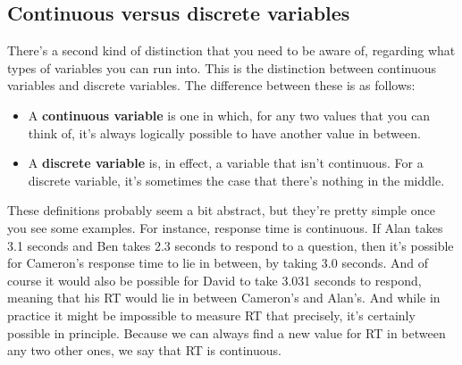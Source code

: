 \documentclass[
]{book}
\begin{document}
\hypertarget{continuous-versus-discrete-variables}{%
\subsection{Continuous versus discrete variables}\label{continuous-versus-discrete-variables}}

There's a second kind of distinction that you need to be aware of, regarding what types of variables you can run into. This is the distinction between continuous variables and discrete variables. The difference between these is as follows:

\begin{itemize}
\item
  A \textbf{continuous variable} is one in which, for any two values that you can think of, it's always logically possible to have another value in between.
\item
  A \textbf{discrete variable} is, in effect, a variable that isn't continuous. For a discrete variable, it's sometimes the case that there's nothing in the middle.
\end{itemize}

These definitions probably seem a bit abstract, but they're pretty simple once you see some examples. For instance, response time is continuous. If Alan takes 3.1 seconds and Ben takes 2.3 seconds to respond to a question, then it's possible for Cameron's response time to lie in between, by taking 3.0 seconds. And of course it would also be possible for David to take 3.031 seconds to respond, meaning that his RT would lie in between Cameron's and Alan's. And while in practice it might be impossible to measure RT that precisely, it's certainly possible in principle. Because we can always find a new value for RT in between any two other ones, we say that RT is continuous.
\end{document}
